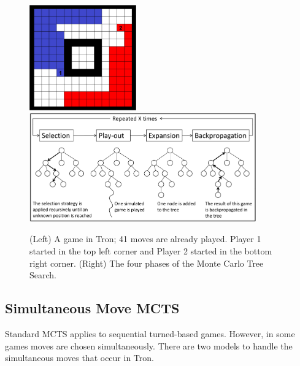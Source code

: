 \documentclass{article}
\begin{document}
\begin{figure}[t]
\begin{center}
\includegraphics[width=4.6cm]{images/tron_field.png} \hspace{0.4cm} \includegraphics[width=9.8cm]{images/mcts-figure}
\caption{(Left) A game in Tron; 41 moves are already played. Player 1 started in the top left corner and Player 2 started in the bottom right corner.
 (Right) The four phases of the Monte Carlo Tree Search. \label{fig:tron-mcts}}
\end{center}
\end{figure}


\subsection{Simultaneous Move MCTS}



Standard MCTS applies to sequential turned-based games. However, in some games moves are chosen simultaneously. 
There are two models to handle the simultaneous moves that occur in Tron. 
\end{document}
